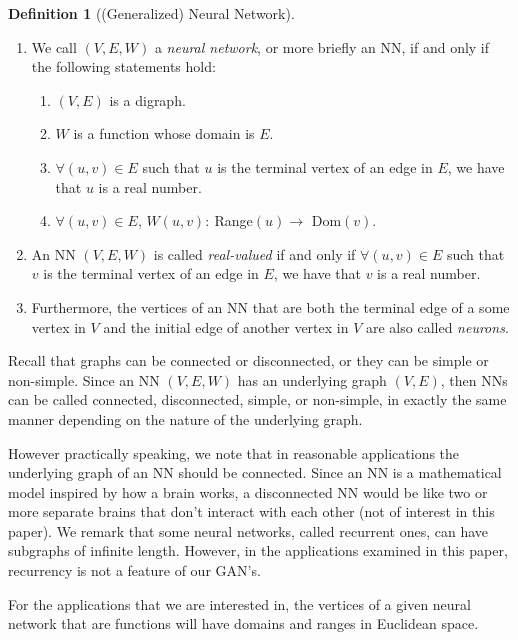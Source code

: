 \documentclass[12pt]{amsart}
\theoremstyle{definition}
\newtheorem{definition}[theorem]{Definition}
\theoremstyle{remark}
\begin{document}
\begin{definition}[(Generalized) Neural Network]
    \leavevmode
    \begin{enumerate}
        \item We call $(V,E,W)$ a {\em neural network}, or more briefly an NN,
       if and only if the following statements hold:
        \begin{enumerate}
            \item $(V,E)$ is a digraph.
            \item $W$ is a function whose domain is $E$.
            \item $\forall (u,v)\in E$ such that $u$ is the terminal vertex 
            of an edge in $E$, we have that $u$ is a real number.
            \item $\forall (u,v)\in E$, $W(u,v):\ $Range$(u)\rightarrow$ Dom$(v)$.
        \end{enumerate}
        \item An NN $(V,E,W)$ is called {\em real-valued} if and only if $\forall (u,v)\in E$
        such that $v$ is the terminal vertex of an edge in $E$, we have that $v$ is a real number.
        \item Furthermore, the vertices of an NN that are both the terminal edge
        of a some vertex in $V$ and the initial edge of another vertex in $V$ are
        also called {\em neurons}.
    \end{enumerate}
\end{definition}

Recall that graphs can be connected or disconnected, or they can be simple or 
non-simple. Since an NN $(V,E,W)$ has an underlying graph $(V,E)$, then NNs can be
called connected, disconnected, simple, or non-simple, in exactly the same 
manner depending on the nature of the underlying graph.

However practically speaking, we note that in reasonable applications the 
underlying graph of an NN should be connected. Since an NN is a mathematical 
model inspired by how a brain works, a disconnected NN would be like two 
or more separate brains that don't interact with each other (not of interest in
this paper).  We remark that some neural networks, called recurrent ones, can 
have subgraphs of infinite length.  However, in the applications examined in this paper, 
recurrency is not a feature of our GAN's.

For the applications that we are interested in, the vertices of a given 
neural network that are functions will have domains and ranges in Euclidean space.
\end{document}
